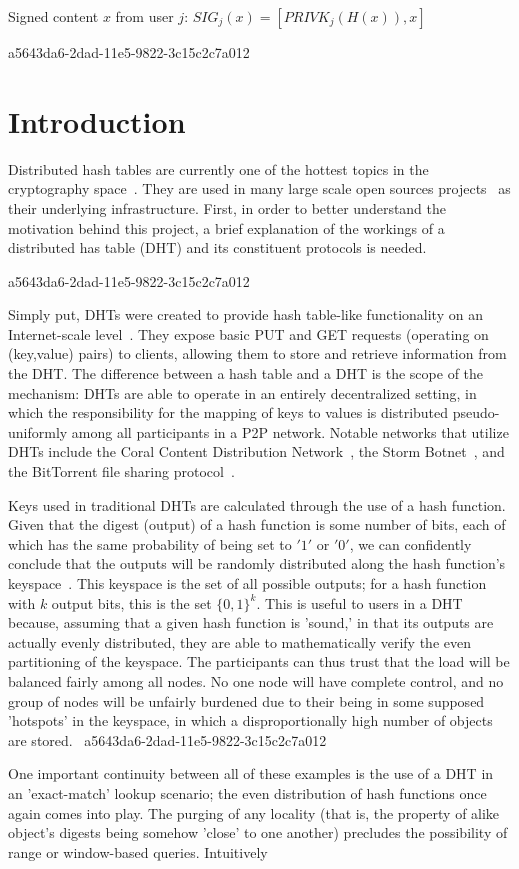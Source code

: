 \documentclass[12pt]{article}
\begin{document}
Signed content $x$ from user $j$: $SIG_j(x) = \left[ PRIVK_j( H(x) ), x \right]$

a5643da6-2dad-11e5-9822-3c15c2c7a012\section{Introduction}
\par Distributed hash tables are currently one of the hottest topics in the cryptography space~\cite{Stoica:2001dj,Rowstron:2001ea,Ratnasamy:2001wn}. They are used in many large scale open sources projects~\cite{Freitas:2013tb,Xu:2010vs,Perfitt:2010fh} as their underlying infrastructure. First, in order to better understand the motivation behind this project, a brief explanation of the workings of a distributed has table (DHT) and its constituent protocols is needed.

a5643da6-2dad-11e5-9822-3c15c2c7a012\par Simply put, DHTs were created to provide hash table-like functionality on an Internet-scale level~\cite{Ratnasamy:2001wn}. They expose basic PUT and GET requests (operating on (key,value) pairs) to clients, allowing them to store and retrieve information from the DHT. The difference between a hash table and a DHT is the scope of the mechanism: DHTs are able to operate in an entirely decentralized setting, in which the responsibility for the mapping of keys to values is distributed pseudo-uniformly among all participants in a P2P network. Notable networks that utilize DHTs include the Coral Content Distribution Network~\cite{Freedman:2004vb}, the Storm Botnet~\cite{Holz:2008uk}, and the BitTorrent file sharing protocol~\cite{Cohen:y1_8mBnw}.

\par Keys used in traditional DHTs are calculated through the use of a hash function. Given that the digest (output) of a hash function is some number of bits, each of which has the same probability of being set to $'1'$ or $'0'$, we can confidently conclude that the outputs will be randomly distributed along the hash function's keyspace~. This keyspace is the set of all possible outputs; for a hash function with $k$ output bits, this is the set $\{0,1\}^k$. This is useful to users in a DHT because, assuming that a given hash function is 'sound,' in that its outputs are actually evenly distributed, they are able to mathematically verify the even partitioning of the keyspace. The participants can thus trust that the load will be balanced fairly among all nodes. No one node will have complete control, and no group of nodes will be unfairly burdened due to their being in some supposed 'hotspots' in the keyspace, in which a disproportionally high number of objects are stored.~
a5643da6-2dad-11e5-9822-3c15c2c7a012
\par One important continuity between all of these examples is the use of a DHT in an 'exact-match' lookup scenario; the even distribution of hash functions once again comes into play. The purging of any locality (that is, the property of alike object's digests being somehow 'close' to one another) precludes the possibility of range or window-based queries. Intuitively
\end{document}
